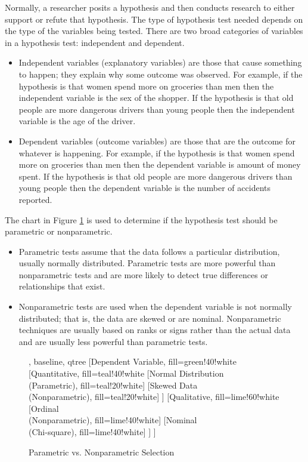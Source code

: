 Normally, a researcher posits a hypothesis and then conducts research to either support or refute that hypothesis. The type of hypothesis test needed depends on the type of the variables being tested. There are two broad categories of variables in a hypothesis test: independent and dependent.

\begin{itemize}
	\item Independent variables (explanatory variables) are those that cause something to happen; they explain why some outcome was observed. For example, if the hypothesis is that women spend more on groceries than men then the independent variable is the sex of the shopper. If the hypothesis is that old people are more dangerous drivers than young people then the independent variable is the age of the driver.
	\item Dependent variables (outcome variables) are those that are the outcome for whatever is happening. For example, if the hypothesis is that women spend more on groceries than men then the dependent variable is amount of money spent. If the hypothesis is that old people are more dangerous drivers than young people then the dependent variable is the number of accidents reported.
\end{itemize}

The chart in Figure \ref{fig06.10} is used to determine if the hypothesis test should be parametric or nonparametric.

\begin{itemize}
	\item Parametric tests assume that the data follows a particular distribution, usually normally distributed. Parametric tests are more powerful than nonparametric tests and are more likely to detect true differences or relationships that exist.
	\item Nonparametric tests are used when the dependent variable is not normally distributed; that is, the data are skewed or are nominal. Nonparametric techniques are usually based on ranks or signs rather than the actual data and are usually less powerful than parametric tests.
\end{itemize}

\begin{figure}[H]
	\centering
	
	
	\begin{forest}, baseline, qtree
		[Dependent Variable, fill=green!40!white
		[{Quantitative}, fill=teal!40!white
		[{Normal Distribution\\(Parametric)}, fill=teal!20!white]
		[{Skewed Data\\(Nonparametric)}, fill=teal!20!white]
		]
		[{Qualitative}, fill=lime!60!white
		[{Ordinal\\(Nonparametric)}, fill=lime!40!white]
		[{Nominal\\(Chi-square)}, fill=lime!40!white]
		]
		]
	\end{forest}
	
	\caption{Parametric vs. Nonparametric Selection}
	\label{fig06.10}
\end{figure}

